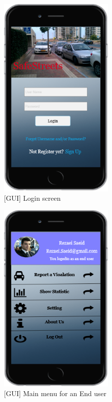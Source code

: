  \begin{figure}[h]
		\centering
      \includegraphics[width=0.5\textwidth]{GUI/UserLogin.png}
      \caption{[GUI] Login screen}   \label{fig:UserLogin}
\end{figure}

\begin{figure}[h]
		\centering
      \includegraphics[width=0.5\textwidth]{GUI/MainMenuEndUser.png}
      \caption{[GUI] Main menu for an End user}   \label{fig:MainMenuEndUser}
\end{figure}

